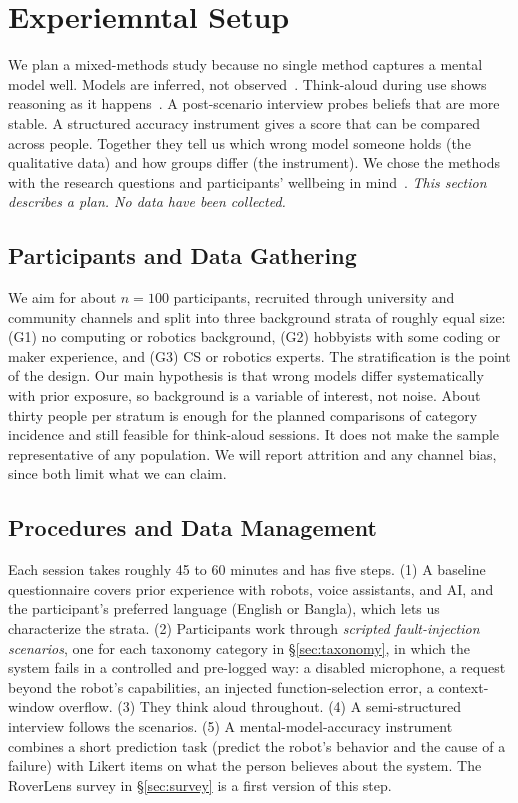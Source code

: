 \documentclass[sigconf]{acmart}
\begin{document}
\section{Experiemntal Setup}\label{sec:data}

We plan a mixed-methods study because no single method captures a mental model well. Models are inferred, not observed~\cite{gero2020mental, tabrez2020survey}. Think-aloud during use shows reasoning as it happens~\cite{ericsson1993protocol}. A post-scenario interview probes beliefs that are more stable. A structured accuracy instrument gives a score that can be compared across people. Together they tell us which wrong model someone holds (the qualitative data) and how groups differ (the instrument). We chose the methods with the research questions and participants' wellbeing in mind~\cite{preece2023interaction}. \emph{This section describes a plan. No data have been collected.}

\subsection{Participants and Data Gathering}\label{sec:participants}
We aim for about $n=100$ participants, recruited through university and community channels and split into three background strata of roughly equal size: (G1) no computing or robotics background, (G2) hobbyists with some coding or maker experience, and (G3) CS or robotics experts. The stratification is the point of the design. Our main hypothesis is that wrong models differ systematically with prior exposure, so background is a variable of interest, not noise. About thirty people per stratum is enough for the planned comparisons of category incidence and still feasible for think-aloud sessions. It does not make the sample representative of any population. We will report attrition and any channel bias, since both limit what we can claim.

\subsection{Procedures and Data Management}
Each session takes roughly 45 to 60 minutes and has five steps. (1) A baseline questionnaire covers prior experience with robots, voice assistants, and AI, and the participant's preferred language (English or Bangla), which lets us characterize the strata. (2) Participants work through \emph{scripted fault-injection scenarios}, one for each taxonomy category in \S\ref{sec:taxonomy}, in which the system fails in a controlled and pre-logged way: a disabled microphone, a request beyond the robot's capabilities, an injected function-selection error, a context-window overflow. (3) They think aloud throughout. (4) A semi-structured interview follows the scenarios. (5) A mental-model-accuracy instrument combines a short prediction task (predict the robot's behavior and the cause of a failure) with Likert items on what the person believes about the system. The RoverLens survey in \S\ref{sec:survey} is a first version of this step.
\end{document}
